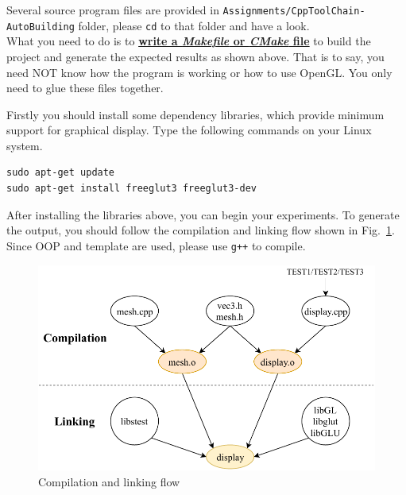 \documentclass[english]{../TexTemplate/thesis}
\begin{document}
Several source program files are provided in \verb'Assignments/CppToolChain-AutoBuilding' folder, please \verb'cd' to that folder and have a look.\\
What you need to do is to \underline{\textbf{write a \emph{Makefile} or \emph{CMake} file}} to build the project and generate the expected results as shown above.
That is to say, you need NOT know how the program is working or how to use OpenGL.
You only need to glue these files together.

Firstly you should install some dependency libraries, which provide minimum support for graphical display.
Type the following commands on your Linux system.
\begin{lstlisting}
sudo apt-get update
sudo apt-get install freeglut3 freeglut3-dev
\end{lstlisting}

After installing the libraries above, you can begin your experiments.
To generate the output, you should follow the compilation and linking flow shown in Fig.~\ref{fig:autobuild}.
Since OOP and template are used, please use \verb'g++' to compile.
\begin{figure}[H]
\centering
\includegraphics[width=0.8\linewidth]{fig/assignments/autobuild.pdf}
\caption{Compilation and linking flow}
\label{fig:autobuild}
\end{figure}
\end{document}
